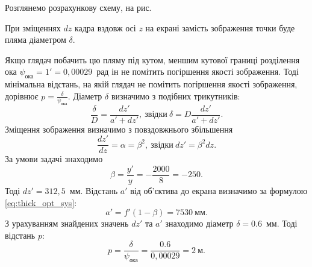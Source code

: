 \begin{solutionexample}

	Розглянемо розрахункову схему, на рис.
	\begin{center}
		
	\end{center}
	При зміщеннях $dz$ кадра вздовж осі $z$ на екрані замість зображення точки буде пляма діаметром $\delta$.

	Якщо глядач побачить цю пляму під кутом, меншим кутової границі
	розділення ока $\psi_\text{ока} = 1' = 0,00029$~рад ін не помітить погіршення якості зображення. Тоді  мінімальна відстань, на якій глядач не помітить погіршення якості
	зображення, дорівнює $p = \frac{\delta}{\psi_\text{ока}}$. Діаметр $\delta$ визначимо з подібних трикутників:
	\begin{equation*}
		\frac{\delta}{D} = \frac{dz'}{a' + dz'},\ \text{звідки}\ \delta = D\frac{dz'}{a' + dz'}.
	\end{equation*}
	Зміщення зображення визначимо з повздовжнього збільшення
	\begin{equation*}
		\frac{dz'}{dz} = \alpha = \beta^2,\ \text{звідки}\  dz' = \beta^2 dz.
	\end{equation*}
	За умови задачі знаходимо
	\begin{equation*}
		\beta = \frac{y'}{y} = -\frac{2000}{8} = -250.
	\end{equation*}
	Тоді $dz' = 312,5$~мм. Відстань $a'$ від об'єктива до екрана визначимо за формулою \eqref{eq:thick_opt_sys}:
	\begin{equation*}
		a ' = f' (1 - \beta) = 7530\ \text{мм}.
	\end{equation*}
	З урахуванням знайдених значень $dz'$ та $a'$ знаходимо діаметр $\delta = 0.6$~мм. Тоді відстань $p$:
	\begin{equation*}
		p = \frac{\delta}{\psi_\text{ока}} = \frac{0.6}{0,00029} = 2\ \text{м}.
	\end{equation*}
\end{solutionexample}

